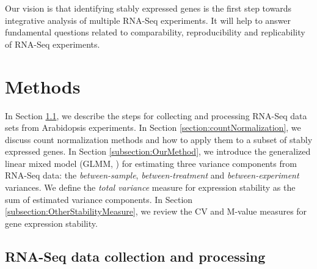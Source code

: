 \documentclass[letterpaper,12pt]{article}
\begin{document}
Our vision is that identifying stably expressed genes is the first step
towards integrative analysis of multiple RNA-Seq experiments. It will help to
answer fundamental questions related to  comparability, reproducibility and
replicability of RNA-Seq experiments.

\section{Methods} 
\label{section:Methods}
In Section \ref{section:DataCollection}, we describe the steps for collecting
and processing RNA-Seq data sets from Arabidopsis experiments.  In Section
\ref{section:countNormalization}, we discuss count normalization methods and
how to apply them to a subset of stably expressed genes.
In Section \ref{subsection:OurMethod},  we introduce the generalized linear
mixed model (GLMM, \citealt{mcculloch2001generalized}) for estimating three
variance components from RNA-Seq data: the \textit{between-sample},
\textit{between-treatment} and \textit{between-experiment} variances.  We
define the \textit{total variance} measure for expression stability as the sum
of estimated variance components.  In Section
\ref{subsection:OtherStabilityMeasure}, we review the CV and M-value measures
for gene expression stability.



\subsection{RNA-Seq data collection and processing}\label{section:DataCollection} 
\end{document}
